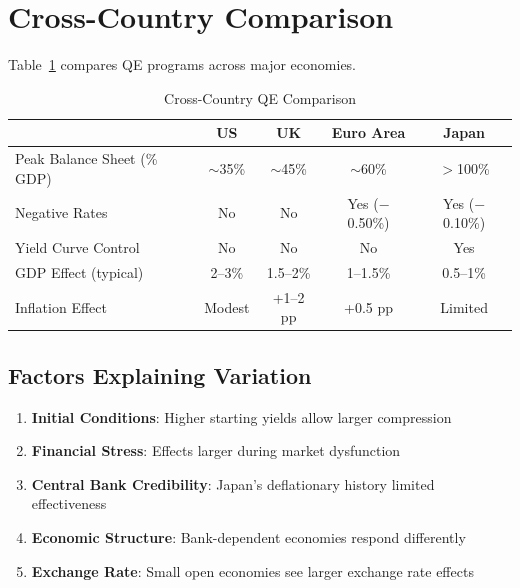 \documentclass[11pt,a4paper]{article}
\begin{document}
\section{Cross-Country Comparison}

Table~\ref{tab:comparison} compares QE programs across major economies.

\begin{table}[H]
\centering
\caption{Cross-Country QE Comparison}
\label{tab:comparison}
\begin{tabular}{lcccc}
\toprule
& \textbf{US} & \textbf{UK} & \textbf{Euro Area} & \textbf{Japan} \\
\midrule
Peak Balance Sheet (\% GDP) & $\sim$35\% & $\sim$45\% & $\sim$60\% & $>$100\% \\
Negative Rates & No & No & Yes ($-$0.50\%) & Yes ($-$0.10\%) \\
Yield Curve Control & No & No & No & Yes \\
GDP Effect (typical) & 2--3\% & 1.5--2\% & 1--1.5\% & 0.5--1\% \\
Inflation Effect & Modest & +1--2 pp & +0.5 pp & Limited \\
\bottomrule
\end{tabular}
\end{table}

\subsection{Factors Explaining Variation}

\begin{enumerate}
    \item \textbf{Initial Conditions}: Higher starting yields allow larger compression
    \item \textbf{Financial Stress}: Effects larger during market dysfunction
    \item \textbf{Central Bank Credibility}: Japan's deflationary history limited effectiveness
    \item \textbf{Economic Structure}: Bank-dependent economies respond differently
    \item \textbf{Exchange Rate}: Small open economies see larger exchange rate effects
\end{enumerate}

\end{document}
